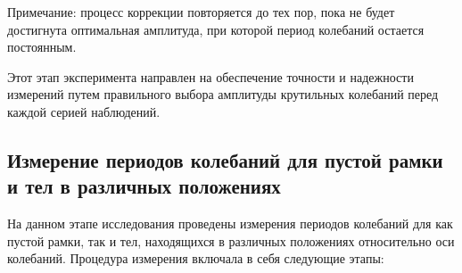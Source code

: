     Примечание: процесс коррекции повторяется до тех пор, пока не будет достигнута оптимальная амплитуда, при которой период колебаний остается постоянным.

Этот этап эксперимента направлен на обеспечение точности и надежности измерений путем правильного выбора амплитуды крутильных колебаний перед каждой серией наблюдений.

\subsection{Измерение периодов колебаний для пустой рамки и тел в различных положениях}

На данном этапе исследования проведены измерения периодов колебаний для как пустой рамки, так и тел, находящихся в различных положениях относительно оси колебаний. Процедура измерения включала в себя следующие этапы:

